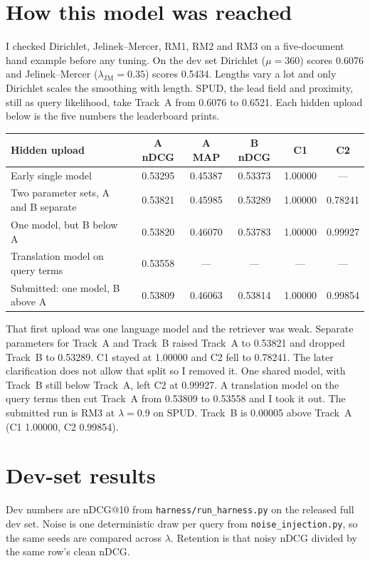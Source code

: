 \documentclass[10pt,a4paper]{article}
\begin{document}
\section{How this model was reached}

I checked Dirichlet, Jelinek--Mercer, RM1, RM2 and RM3 on a five-document hand example before any tuning. On the dev set Dirichlet ($\mu{=}360$) scores 0.6076 and Jelinek--Mercer ($\lambda_{\mathrm{JM}}{=}0.35$) scores 0.5434. Lengths vary a lot and only Dirichlet scales the smoothing with length. SPUD, the lead field and proximity, still as query likelihood, take Track~A from 0.6076 to 0.6521. Each hidden upload below is the five numbers the leaderboard prints.

\begin{center}
\scriptsize
\begin{tabular}{lccccc}
\toprule
Hidden upload & A nDCG & A MAP & B nDCG & C1 & C2 \\
\midrule
Early single model & 0.53295 & 0.45387 & 0.53373 & 1.00000 & --- \\
Two parameter sets, A and B separate & 0.53821 & 0.45985 & 0.53289 & 1.00000 & 0.78241 \\
One model, but B below A & 0.53820 & 0.46070 & 0.53783 & 1.00000 & 0.99927 \\
Translation model on query terms & 0.53558 & --- & --- & --- & --- \\
Submitted: one model, B above A & 0.53809 & 0.46063 & 0.53814 & 1.00000 & 0.99854 \\
\bottomrule
\end{tabular}
\end{center}

That first upload was one language model and the retriever was weak. Separate parameters for Track~A and Track~B raised Track~A to 0.53821 and dropped Track~B to 0.53289. C1 stayed at 1.00000 and C2 fell to 0.78241. The later clarification does not allow that split so I removed it. One shared model, with Track~B still below Track~A, left C2 at 0.99927. A translation model on the query terms then cut Track~A from 0.53809 to 0.53558 and I took it out. The submitted run is RM3 at $\lambda{=}0.9$ on SPUD. Track~B is 0.00005 above Track~A (C1 1.00000, C2 0.99854).

\section{Dev-set results}

Dev numbers are nDCG@10 from \texttt{harness/run\_harness.py} on the released full dev set. Noise is one deterministic draw per query from \texttt{noise\_injection.py}, so the same seeds are compared across $\lambda$. Retention is that noisy nDCG divided by the same row's clean nDCG.
\end{document}
